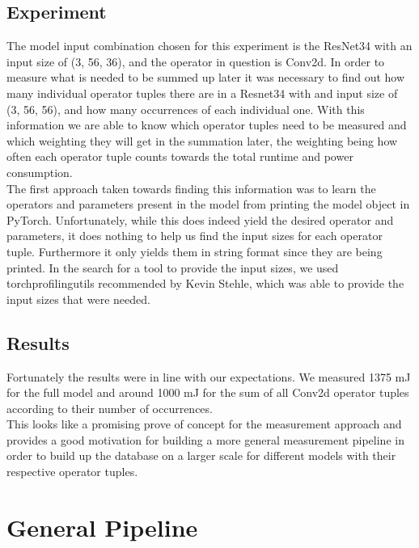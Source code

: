 \documentclass[conference]{IEEEtran}
\begin{document}
\subsection{Experiment}
The model input combination chosen for this experiment is the ResNet34 with an input size of (3, 56, 36), and the operator in question is Conv2d. In order to measure what is needed to be summed up later it was necessary to find out how many individual operator tuples there are in a Resnet34 with and input size of (3, 56, 56), and how many occurrences of each individual one. With this information we are able to know which operator tuples need to be measured and which weighting they will get in the summation later, the weighting being how often each operator tuple counts towards the total runtime and power consumption. \\
The first approach taken towards finding this information was to learn the operators and parameters present in the model from printing the model object in PyTorch. Unfortunately, while this does indeed yield the desired operator and parameters, it does nothing to help us find the input sizes for each operator tuple. Furthermore it only yields them in string format since they are being printed. In the search for a tool to provide the input sizes, we used torchprofilingutils recommended by Kevin Stehle, which was able to provide the input sizes that were needed.

\subsection{Results}
Fortunately the results were in line with our expectations. We measured 1375 mJ for the full model and around 1000 mJ for the sum of all Conv2d operator tuples according to their number of occurrences. \\
This looks like a promising prove of concept for the measurement approach and provides a good motivation for building a more general measurement pipeline in order to build up the database on a larger scale for different models with their respective operator tuples. 

\section{General Pipeline}
\end{document}

